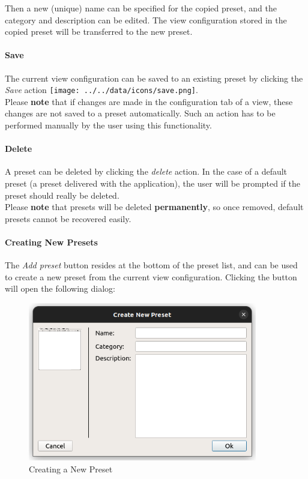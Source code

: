 Then a new (unique) name can be specified for the copied preset, and the category and description can be edited.
The view configuration stored in the copied preset will be transferred to the new preset.

\paragraph*{Save} The current view configuration can be saved to an existing preset by clicking the \textit{Save} action \texttt{[image: ../../data/icons/save.png]}. \\

Please \textbf{note} that if changes are made in the configuration tab of a view, these changes are not saved to a preset automatically. 
Such an action has to be performed manually by the user using this functionality.

\paragraph*{Delete} A preset can be deleted by clicking the \textit{delete} action.
In the case of a default preset (a preset delivered with the application), the user will be prompted if the preset should really
be deleted. \\

Please \textbf{note} that presets will be deleted \textbf{permanently}, so once removed, default presets cannot be recovered easily.

\paragraph*{Creating New Presets} The \textit{Add preset} button resides at the bottom of the preset list, 
and can be used to create a new preset from the current view configuration. Clicking the button will open the following dialog:

\begin{figure}[H]
    \center
    \includegraphics[width=10cm]{figures/view_preset_add.png}
  \caption{Creating a New Preset} 
\end{figure}

